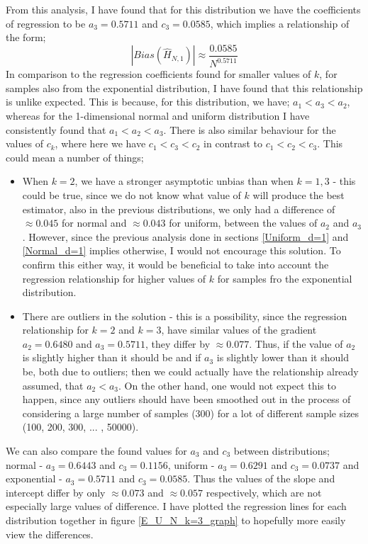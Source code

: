 \documentclass{report}
\begin{document}
From this analysis, I have found that for this distribution we have the coefficients of regression to be $a_{3} = 0.5711$ and $c_{3}=0.0585$, which implies a relationship of the form;
\begin{equation}
|Bias(\hat{H}_{N, 1})| \approx \frac{0.0585}{N^{0.5711}}\nonumber
\end{equation}
In comparison to the regression coefficients found for smaller values of $k$, for samples also from the exponential distribution, I have found that this relationship is unlike expected. This is because, for this distribution, we have; $a_{1} < a_{3} < a_{2}$, whereas for the 1-dimensional normal and uniform distribution I have consistently found that  $a_{1} < a_{2} < a_{3}$. There is also similar behaviour for the values of $c_{k}$, where here we have  $c_{1} < c_{3} < c_{2}$ in contrast to  $c_{1} < c_{2} < c_{3}$. This could mean a number of things;
\begin{itemize}
\item When $k=2$, we have a stronger asymptotic unbias than when $k=1, 3$ - this could be true, since we do not know what value of $k$ will produce the best estimator, also in the previous distributions, we only had a difference of $\approx 0.045$ for normal and $\approx 0.043$ for uniform, between the values of $a_{2}$ and $a_{3}$. However, since the previous analysis done in sections \ref{Uniform_d=1} and \ref{Normal_d=1} implies otherwise, I would not encourage this solution. To confirm this either way, it would be beneficial to take into account the regression relationship for higher values of $k$ for samples fro the exponential distribution.

\item There are outliers in the solution - this is a possibility, since the regression relationship for $k=2$ and $k=3$, have similar values of the gradient $a_{2} = 0.6480$ and $a_{3}=0.5711$, they differ by $\approx 0.077$. Thus, if the value of $a_{2}$ is slightly higher than it should be and if $a_{3}$ is slightly lower than it should be, both due to outliers; then we could actually have the relationship already assumed, that $a_{2} < a_{3}$. On the other hand, one would not expect this to happen, since any outliers should have been smoothed out in the process of considering a large number of samples (300) for a lot of different sample sizes (100, 200, 300, ... , 50000).

\end{itemize}

We can also compare the found values for $a_{3}$ and $c_{3}$ between distributions; normal - $a_{3}=0.6443$ and $c_{3}=0.1156$, uniform - $a_{3}=0.6291$ and $c_{3}=0.0737$ and exponential - $a_{3}=0.5711$ and $c_{3}=0.0585$. Thus the values of the slope and intercept differ by only $\approx 0.073$ and $\approx 0.057$ respectively, which are not especially large values of difference. I have plotted the regression lines for each distribution together in figure \ref{E_U_N_k=3_graph} to hopefully more easily view the differences.
\end{document}
